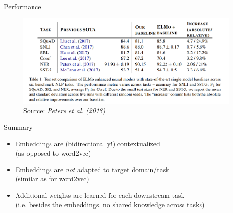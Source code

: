 
\begin{vbframe}{Performance}

\vfill
			
	\begin{figure}
		\centering
		\includegraphics[width = 12cm]{figure/elmo-sota.png}\\ 
		\footnotesize{Source:} \href{https://aclanthology.org/N18-1202.pdf}{\footnotesize \it Peters et al. (2018)}
	\end{figure}

\vfill

\end{vbframe}


\begin{vbframe}{Summary}

\vfill

	\begin{itemize}
		\item Embeddings are (bidirectionally!) contextualized \\
					(as opposed to word2vec)
		\item Embeddings are \textit{not} adapted to target domain/task \\
					(similar as for word2vec)
		\item Additional weights are learned for each downstream task \\
					(i.e. besides the embeddings, no shared knowledge across tasks)
	\end{itemize}

\vfill

\end{vbframe}


\endlecture

